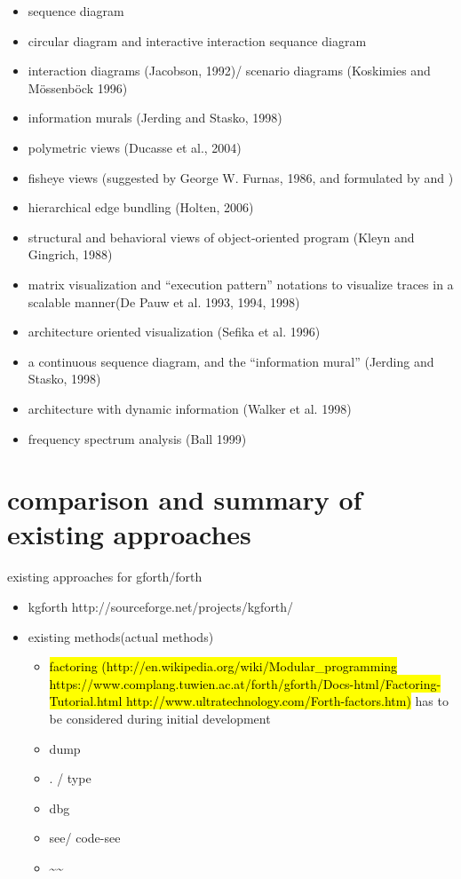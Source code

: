 \begin{itemize}
\item sequence diagram
\item circular diagram and interactive interaction sequance diagram \cite{Cornelissen2009}
\item interaction diagrams (Jacobson, 1992)/ scenario diagrams (Koskimies and Mössenböck 1996)
\item information murals (Jerding and Stasko, 1998)
\item polymetric views (Ducasse et al., 2004)
\item fisheye views (suggested by George W. Furnas, 1986, and formulated by \cite{Storey:1995:GLA:647547.728600} and \cite{Sarkar:1994:GFV:198366.198384})
\item hierarchical edge bundling (Holten, 2006)
\item structural and behavioral views of object-oriented program (Kleyn and Gingrich, 1988)
\item matrix visualization and “execution pattern” notations \cite{Pauw98executionpatterns} to visualize traces in a scalable manner(De Pauw et al. 1993, 1994, 1998) 
\item architecture oriented visualization (Sefika et al. 1996)
\item a continuous sequence diagram, and the “information mural” (Jerding and Stasko, 1998)
\item architecture with dynamic information (Walker et al. 1998)
\item frequency spectrum analysis (Ball 1999)
\end{itemize}

\section{comparison and summary of existing approaches}

existing approaches for gforth/forth

\begin{itemize}
\item kgforth http://sourceforge.net/projects/kgforth/
\item existing methods(actual methods)
	\begin{itemize}
	\item \hl{factoring (http://en.wikipedia.org/wiki/Modular\_programming https://www.complang.tuwien.ac.at/forth/gforth/Docs-html/Factoring-Tutorial.html http://www.ultratechnology.com/Forth-factors.htm)} has to be considered during initial development
	\item dump
	\item . / type
	\item dbg
	\item see/ code-see
	\item \textasciitilde\textasciitilde
	\end{itemize}
\end{itemize}